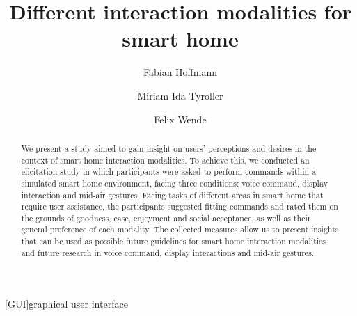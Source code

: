 \documentclass[sigchi]{acmart}
\begin{document}
	\begin{acronym}
	[GUI]{graphical user interface}
	\end{acronym}
	
	\title{Different interaction modalities for smart home}
	
	\author{Fabian Hoffmann}
	
	\author{Miriam Ida Tyroller}
	
	\author{Felix Wende}
	
	
	\begin{abstract}
		We present a study aimed to gain insight on users' perceptions and desires in the context of smart home interaction modalities. To achieve this, we conducted an elicitation study in which participants were asked to perform commands within a simulated smart home environment, facing three conditions: voice command, display interaction and mid-air gestures. Facing tasks of different areas in smart home that require user assistance, the participants suggested fitting commands and rated them on the grounds of goodness, ease, enjoyment and social acceptance, as well as their general preference of each modality. The collected measures allow us to present insights that can be used as possible future guidelines for smart home interaction modalities and future research in voice command, display interactions and mid-air gestures.
	\end{abstract}
	
\end{document}
